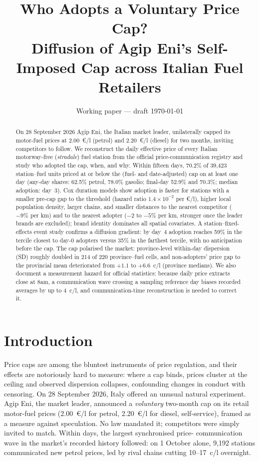\documentclass[11pt]{article}
\title{Who Adopts a Voluntary Price Cap? \\
\large Diffusion of Agip Eni's Self-Imposed Cap across Italian Fuel Retailers}
\author{Working paper --- draft \today}
\date{}
\begin{document}
\maketitle

\begin{abstract}
On 28 September 2026 Agip Eni, the Italian market leader, unilaterally
capped its motor-fuel prices at 2.00~\euro/l (petrol) and 2.20~\euro/l
(diesel) for two months, inviting competitors to follow. We reconstruct
the daily effective price of every Italian motorway-free (\emph{stradale})
fuel station from the official price-communication registry and study who
adopted the cap, when, and why. Within fifteen days, 70.2\% of
39{,}423 station--fuel units priced at or below the (fuel- and
date-adjusted) cap on at least one day (any-day shares: 62.5\% petrol,
78.0\% gasolio; final-day 52.9\% and 70.3\%; median adoption: day~3). Cox duration models show adoption is faster for stations with a
smaller pre-cap gap to the threshold (hazard ratio $1.4\times 10^{-2}$ per
\euro/l), higher local population density, larger chains, and smaller
distances to the nearest competitor ($-9\%$ per km) and to the nearest
adopter ($-2$ to $-5\%$ per km, stronger once the leader brands are
excluded); brand identity dominates all spatial covariates.
A station--fixed-effects event study confirms a diffusion gradient:
by day~4 adoption reaches 59\% in the tercile closest to day-0 adopters
versus 35\% in the farthest tercile, with no anticipation before the cap.
The cap polarised the market: province-level within-day dispersion (SD)
roughly doubled in 214 of 220 province--fuel cells, and
non-adopters' price gap to the provincial mean deteriorated from
$+1.1$ to $+6.6$~c/l (province medians). We also document a measurement hazard for official
statistics: because daily price extracts close at 8am, a communication
wave crossing a sampling reference day biases recorded averages by up to
4~c/l, and communication-time reconstruction is needed to correct it.
\end{abstract}

\section{Introduction}
\label{sec:intro}

Price caps are among the bluntest instruments of price regulation, and
their effects are notoriously hard to measure: where a cap binds, prices
cluster at the ceiling and observed dispersion collapses, confounding
changes in conduct with censoring. On 28 September 2026, Italy offered an
unusual natural experiment. Agip Eni, the market leader, announced a
\emph{voluntary} two-month cap on its retail motor-fuel prices
(2.00~\euro/l for petrol, 2.20~\euro/l for diesel, self-service), framed
as a measure against speculation. No law mandated it; competitors were
simply invited to match. Within days, the largest synchronised price-
communication wave in the market's recorded history followed: on
1 October alone, 9{,}192 stations communicated new petrol prices, led by
rival chains cutting 10--17~c/l overnight.
\end{document}

